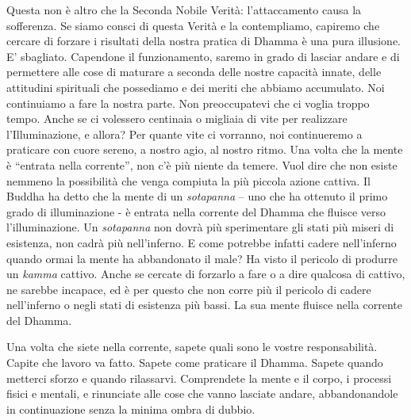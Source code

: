 Questa non è altro che la Seconda Nobile Verità: l'attaccamento causa la
sofferenza. Se siamo consci di questa Verità e la contempliamo, capiremo
che cercare di forzare i risultati della nostra pratica di Dhamma è una
pura illusione. E' sbagliato. Capendone il funzionamento, saremo in
grado di lasciar andare e di permettere alle cose di maturare a seconda
delle nostre capacità innate, delle attitudini spirituali che possediamo
e dei meriti che abbiamo accumulato. Noi continuiamo a fare la nostra
parte. Non preoccupatevi che ci voglia troppo tempo. Anche se ci
volessero centinaia o migliaia di vite per realizzare l'Illuminazione, e
allora? Per quante vite ci vorranno, noi continueremo a praticare con
cuore sereno, a nostro agio, al nostro ritmo. Una volta che la mente è
``entrata nella corrente'', non c'è più niente da temere. Vuol dire che
non esiste nemmeno la possibilità che venga compiuta la più piccola
azione cattiva. Il Buddha ha detto che la mente di
un \emph{sotapanna} -- uno che ha ottenuto il primo grado di
illuminazione - è entrata nella corrente del Dhamma che fluisce verso
l'illuminazione. Un \emph{sotapanna} non dovrà più sperimentare gli stati più
miseri di esistenza, non cadrà più nell'inferno. E come potrebbe infatti
cadere nell'inferno quando ormai la mente ha abbandonato il male? Ha
visto il pericolo di produrre un \emph{kamma} cattivo. Anche se cercate di
forzarlo a fare o a dire qualcosa di cattivo, ne sarebbe incapace, ed è
per questo che non corre più il pericolo di cadere nell'inferno o negli
stati di esistenza più bassi. La sua mente fluisce nella corrente del
Dhamma.

Una volta che siete nella corrente, sapete quali sono le vostre
responsabilità. Capite che lavoro va fatto. Sapete come praticare il
Dhamma. Sapete quando metterci sforzo e quando rilassarvi. Comprendete
la mente e il corpo, i processi fisici e mentali, e rinunciate alle cose
che vanno lasciate andare, abbandonandole in continuazione senza la
minima ombra di dubbio.


